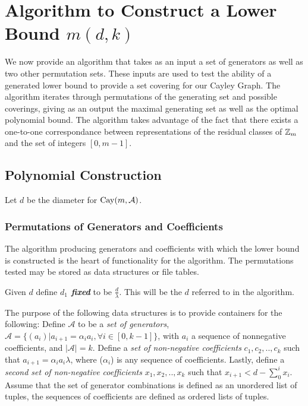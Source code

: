 \section{Algorithm to Construct a Lower Bound $m(d, k)$}

We now provide an algorithm that takes as an input a set of generators as well as two other permutation sets. These inputs are used to test the ability of a generated lower bound to provide a set covering for our Cayley Graph. The algorithm iterates through permutations of the generating set and possible coverings, giving as an output the maximal generating set as well as the optimal polynomial bound. \n
The algorithm takes advantage of the fact that there exists a one-to-one correspondance between representations of the residual classes of $\mbox{$\mathbb Z$}_m$ and the set of integers $[0, m-1]$.\n

\subsection{Polynomial Construction}
\noindent
Let $d$ be the diameter for $\operatorname{Cay}(m, \mathcal{A})$.\n 

\subsubsection{Permutations of Generators and Coefficients}
The algorithm producing generators and coefficients with which the lower bound is constructed is the heart of functionality for the algorithm. \n
The permutations tested may be stored as data structures or file tables.

\noindent
Given $d$ define \emph{\bf{$d_{1}$ fixed}} to be $\frac{d}{\lambda}$. This will be the $d$ referred to in the algorithm.\n

The purpose of the following data structures is to provide containers for the following:\n
Define $\mathcal{A}$ to be a \emph{set of generators}, $\mathcal{A} = \{ (a_{i}) \vert a_{i+1} = \alpha_{i}a_{i},  \forall i \in [0, k-1] \} $, with $a_i$ a sequence of nonnegative coefficients, and $\vert \mathcal{A} \vert = k$.\n
Define a \emph{set of non-negative coefficients} $c_1, c_2, .. , c_k$ such that $a_{i+1} = \alpha_{i}a_{i} \lambda$, where ($\alpha_{i}$) is any sequence of coefficients.\n
Lastly, define a \emph{second set of non-negative coefficients} $x_1, x_2, .., x_{k}$ such that $x_{i+1} < d - \sum_{0}^{i}x_i$.
\noindent
Assume that the set of generator combinations is defined as an unordered list of tuples, the sequences of coefficients are defined as ordered lists of tuples.

